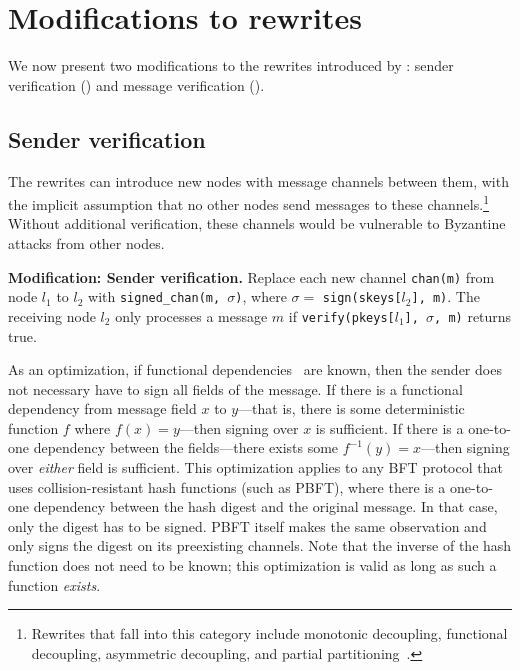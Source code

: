 \section{Modifications to rewrites}
\label{sec:modifications-to-rewrites}

We now present two modifications to the rewrites introduced by \sigmodpaper{}: sender verification () and message verification ().

\subsection{Sender verification}
\label{sec:sender-verification}
The rewrites can introduce new nodes with message channels between them, with the implicit assumption that no other nodes send messages to these channels.\footnote{Rewrites that fall into this category include monotonic decoupling, functional decoupling, asymmetric decoupling, and partial partitioning~\cite{autocomp}.}
Without additional verification, these channels would be vulnerable to Byzantine attacks from other nodes.

\textbf{Modification: Sender verification.}
Replace each new channel \texttt{chan(m)} from node $l_1$ to $l_2$ with \texttt{signed\_chan(m, $\sigma$)}, where $\sigma =$ \texttt{sign(skeys[$l_2$], m)}.
The receiving node $l_2$ only processes a message $m$ if \texttt{verify(pkeys[$l_1$], $\sigma$, m)} returns true.

As an optimization, if functional dependencies~\cite{autocomp,alice} are known, then the sender does not necessary have to sign all fields of the message.
If there is a functional dependency from message field $x$ to $y$---that is, there is some deterministic function $f$ where $f(x) = y$---then signing over $x$ is sufficient.
If there is a one-to-one dependency between the fields---there exists some $f^{-1}(y) = x$---then signing over \emph{either} field is sufficient.
This optimization applies to any BFT protocol that uses collision-resistant hash functions (such as PBFT), where there is a one-to-one dependency between the hash digest and the original message.
In that case, only the digest has to be signed.
PBFT itself makes the same observation and only signs the digest on its preexisting channels.
Note that the inverse of the hash function does not need to be known; this optimization is valid as long as such a function \emph{exists}.

